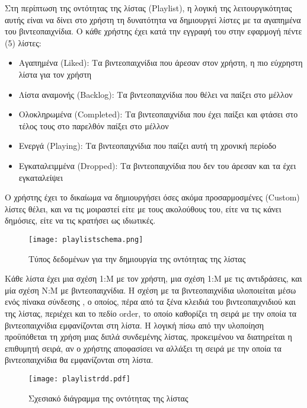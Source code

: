 Στη περίπτωση της οντότητας της λίστας (\textlatin{Playlist}), η λογική
της λειτουργικότητας αυτής είναι να δίνει στο χρήστη τη δυνατότητα να
δημιουργεί λίστες με τα αγαπημένα του βιντεοπαιχνίδια. Ο κάθε χρήστης
έχει κατά την εγγραφή του στην εφαρμογή πέντε (5) λίστες:
\begin{itemize}
\item
  Αγαπημένα (\textlatin{Liked}): Τα βιντεοπαιχνίδια που άρεσαν στον
  χρήστη, η πιο εύχρηστη λίστα για τον χρήστη
\item
  Λίστα αναμονής (\textlatin{Backlog}): Τα βιντεοπαιχνίδια που θέλει να
  παίξει στο μέλλον
\item
  Ολοκληρωμένα (\textlatin{Completed}): Τα βιντεοπαιχνίδια που έχει
  παίξει και φτάσει στο τέλος τους στο παρελθόν παίξει στο μέλλον
\item
  Ενεργά (\textlatin{Playing}): Τα βιντεοπαιχνίδια που παίζει αυτή τη
  χρονική περίοδο
\item
  Εγκαταλειμμένα (\textlatin{Dropped}): Τα βιντεοπαιχνίδια που δεν του
  άρεσαν και τα έχει εγκαταλείψει
\end{itemize}

Ο χρήστης έχει το δικαίωμα να δημιουργήσει όσες ακόμα προσαρμοσμένες
\textlatin{(Custom)} λίστες θέλει, και να τις μοιραστεί είτε με τους
ακολούθους του, είτε να τις κάνει δημόσιες, είτε να τις κρατήσει ως
ιδιωτικές.

\begin{figure}[H]
  \begin{center}
    \texttt{[image: playlistschema.png]}
    \caption{Τύπος δεδομένων για την δημιουργία της οντότητας της
      λίστας}
  \end{center}
  \label{fig:playlistSchema}
\end{figure}

Κάθε λίστα έχει μια σχέση 1:Μ με τον χρήστη, μια σχέση 1:Μ με τις
αντιδράσεις, και μία σχέση Ν:Μ με βιντεοπαιχνίδια. Η σχέση με τα
βιντεοπαιχνίδια υλοποιείται μέσω ενός πίνακα σύνδεσης
\cite{AtlassianJoin}, ο οποίος, πέρα από τα ξένα κλειδιά του
βιντεοπαιχνιδιού και της λίστας, περιέχει και το πεδίο
\textlatin{order}, το οποίο καθορίζει τη σειρά με την οποία τα
βιντεοπαιχνίδια εμφανίζονται στη λίστα. Η λογική πίσω από την υλοποίηση
προϋπόθεται τη χρήση μιας διπλά συνδεμένης λίστας, προκειμένου να
διατηρείται η επιθυμητή σειρά, αν ο χρήστης αποφασίσει να αλλάξει τη
σειρά με την οποία τα βιντεοπαιχνίδια θα εμφανίζονται στη λίστα.

\begin{figure}[H]
  \begin{center}
    \texttt{[image: playlistrdd.pdf]}
    \caption{Σχεσιακό διάγραμμα της οντότητας της λίστας}
  \end{center}
  \label{fig:playlistRdd}
\end{figure}

